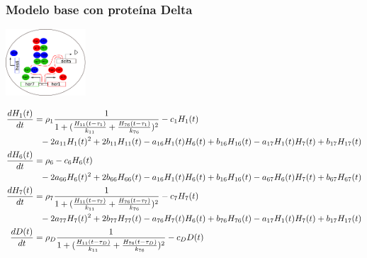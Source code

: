 \documentclass[xcolor=table, xllnames]{beamer}
\begin{document}
\begin{frame}
	\frametitle{Modelo base con prote\'ina Delta}
	\includegraphics[width=3cm]{Figuras/oscilationsDelta.png}
	\begin{scriptsize}
		\centering
		\begin{align*}
		\frac{dH_1(t)}{dt} &= \rho_1 \frac{1}{1+(\frac{H_{11}(t-\tau_1)}{k_{11}} + \frac{H_{76}(t-\tau_1)}{k_{76}})^2}-c_1H_1(t) \\ & \hspace{.25cm}-2a_{11}H_1(t)^2 + 2b_{11}H_{11}(t)-a_{16}H_1(t)H_6(t)+b_{16}H_{16}(t)-a_{17}H_1(t)H_7(t)+b_{17}H_{17}(t) \\ %
		\frac{dH_6(t)}{dt} &= \rho_6 -c_6H_6(t) \\ & \hspace{.25cm} -2a_{66}H_6(t)^2 + 2b_{66}H_{66}(t)-a_{16}H_1(t)H_6(t)+b_{16}H_{16}(t)-a_{67}H_6(t)H_7(t)+b_{67}H_{67}(t) \\ %
		\frac{dH_7(t)}{dt} &= \rho_7 \frac{1}{1+(\frac{H_{11}(t-\tau_7)}{k_{11}} + \frac{H_{76}(t-\tau_7)}{k_{76}})^2}-c_7H_7(t) \\ & \hspace{.25cm}-2a_{77}H_7(t)^2 + 2b_{77}H_{77}(t)-a_{76}H_7(t)H_6(t)+b_{76}H_{76}(t)-a_{17}H_1(t)H_7(t)+b_{17}H_{17}(t) \\
		\frac{dD(t)}{dt} &= \rho_D \frac{1}{1+(\frac{H_{11}(t-\tau_D)}{k_{11}} + \frac{H_{76}(t-\tau_D)}{k_{76}})^2}-c_DD(t) \end{align*}
	\end{scriptsize}
\end{frame}
\end{document}
